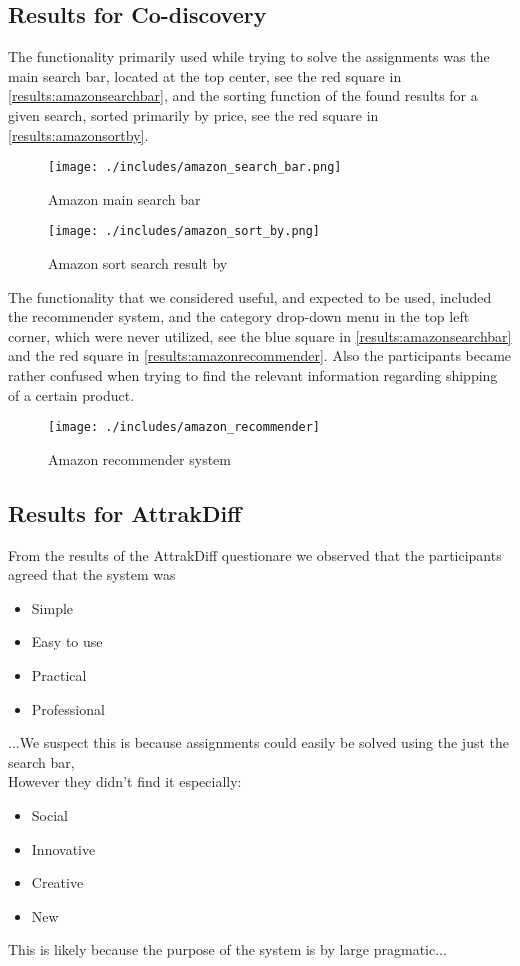 \subsection{Results for Co-discovery}
The functionality primarily used while trying to solve the assignments was the main search bar, located at the top center, see the red square in \autoref{results:amazonsearchbar}, and the sorting function of the found results for a given search, sorted primarily by price, see the red square in \autoref{results:amazonsortby}.

\begin{figure}[h]
\texttt{[image: ./includes/amazon\_search\_bar.png]}
\caption{Amazon main search bar}
\label{results:amazonsearchbar}
\end{figure}

\begin{figure}[h]
\texttt{[image: ./includes/amazon\_sort\_by.png]}
\caption{Amazon sort search result by}
\label{results:amazonsortby}
\end{figure}

The functionality that we considered useful, and expected to be used, included the recommender system, and the category drop-down menu in the top left corner, which were never utilized, see the blue square in \autoref{results:amazonsearchbar} and the red square in \autoref{results:amazonrecommender}. Also the participants became rather confused when trying to find the relevant information regarding shipping of a certain product.

\begin{figure}[H]
\texttt{[image: ./includes/amazon\_recommender]}
\caption{Amazon recommender system}
\label{results:amazonrecommender}
\end{figure}


\subsection{Results for AttrakDiff}
From the results of the AttrakDiff questionare we observed that the participants agreed that the system was
\begin{itemize}
\item Simple
\item Easy to use
\item Practical
\item Professional
\end{itemize}
...We suspect this is because assignments could easily be solved using the just the search bar,  \\
However they didn't find it especially:
\begin{itemize}
\item Social
\item Innovative
\item Creative
\item New
\end{itemize}
This is likely because the purpose of the system is by large pragmatic...